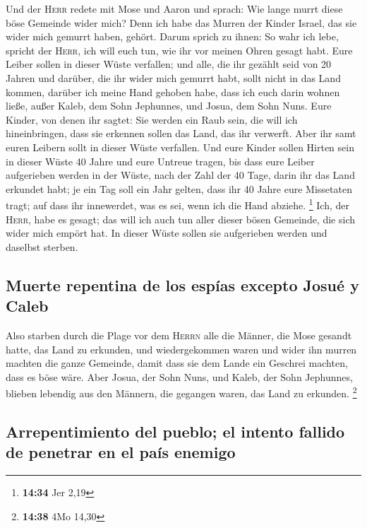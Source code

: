  Und der \textsc{Herr} redete mit Mose und Aaron und
sprach:  Wie lange murrt diese böse Gemeinde wider mich?
Denn ich habe das Murren der Kinder Israel, das sie wider mich gemurrt
haben, gehört.  Darum sprich zu ihnen: So wahr ich lebe,
spricht der \textsc{Herr}, ich will euch tun, wie ihr vor meinen Ohren
gesagt habt.  Eure Leiber sollen in dieser Wüste
verfallen; und alle, die ihr gezählt seid von 20 Jahren und darüber, die
ihr wider mich gemurrt habt,  sollt nicht in das Land
kommen, darüber ich meine Hand gehoben habe, dass ich euch darin wohnen
ließe, außer Kaleb, dem Sohn Jephunnes, und Josua, dem Sohn Nuns.
 Eure Kinder, von denen ihr sagtet: Sie werden ein Raub
sein, die will ich hineinbringen, dass sie erkennen sollen das Land, das
ihr verwerft.  Aber ihr samt euren Leibern sollt in
dieser Wüste verfallen.  Und eure Kinder sollen Hirten
sein in dieser Wüste 40 Jahre und eure Untreue tragen, bis dass eure
Leiber aufgerieben werden in der Wüste,  nach der Zahl
der 40 Tage, darin ihr das Land erkundet habt; je ein Tag soll ein Jahr
gelten, dass ihr 40 Jahre eure Missetaten tragt; auf dass ihr
innewerdet, was es sei, wenn ich die Hand abziehe. \footnote{\textbf{14:34}
  Jer 2,19}  Ich, der \textsc{Herr}, habe es gesagt; das
will ich auch tun aller dieser bösen Gemeinde, die sich wider mich
empört hat. In dieser Wüste sollen sie aufgerieben werden und daselbst
sterben.

\hypertarget{muerte-repentina-de-los-espuxedas-excepto-josuuxe9-y-caleb}{%
\subsection{Muerte repentina de los espías excepto Josué y
Caleb}\label{muerte-repentina-de-los-espuxedas-excepto-josuuxe9-y-caleb}}

 Also starben durch die Plage vor dem \textsc{Herrn} alle
die Männer, die Mose gesandt hatte, das Land zu erkunden, und
wiedergekommen waren und wider ihn murren machten die ganze Gemeinde,
 damit dass sie dem Lande ein Geschrei machten, dass es
böse wäre.  Aber Josua, der Sohn Nuns, und Kaleb, der
Sohn Jephunnes, blieben lebendig aus den Männern, die gegangen waren,
das Land zu erkunden. \footnote{\textbf{14:38} 4Mo 14,30}

\hypertarget{arrepentimiento-del-pueblo-el-intento-fallido-de-penetrar-en-el-pauxeds-enemigo}{%
\subsection{Arrepentimiento del pueblo; el intento fallido de penetrar
en el país
enemigo}\label{arrepentimiento-del-pueblo-el-intento-fallido-de-penetrar-en-el-pauxeds-enemigo}}

